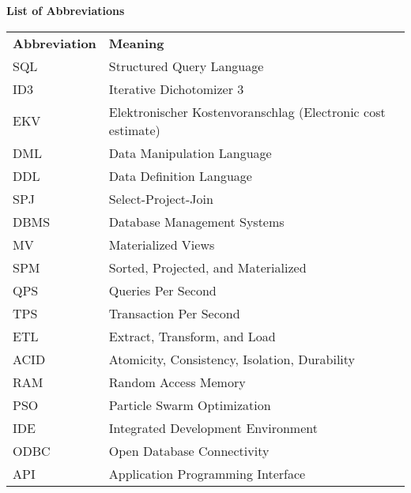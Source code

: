 \thispagestyle{plain}
\cfoot{\thepage} %
\begin{center}
    \huge\textbf{List of Abbreviations}
\end{center}  \vspace{.4cm}

\noindent %

\begin{minipage}{\textwidth}
\begin{tabular}{ll}
    \textbf{Abbreviation} & \textbf{Meaning}\\
    SQL & Structured Query Language\\
    ID3 & Iterative  Dichotomizer 3\\
    EKV & Elektronischer Kostenvoranschlag (Electronic cost estimate)\\
    DML & Data Manipulation Language \\
    DDL & Data Definition Language \\
    SPJ & Select-Project-Join \\
    DBMS & Database Management Systems \\
    MV & {Materialized Views} \\
    SPM & Sorted, Projected, and Materialized \\
    QPS & Queries Per Second \\
    TPS & Transaction Per Second \\
    ETL & Extract, Transform, and Load \\
    ACID & Atomicity, Consistency, Isolation, Durability \\
    RAM & Random Access Memory \\
    PSO & Particle Swarm Optimization \\
    IDE & Integrated Development Environment\\
    ODBC & Open Database Connectivity\\
    API & Application Programming Interface\\

\end{tabular}
\end{minipage}



    